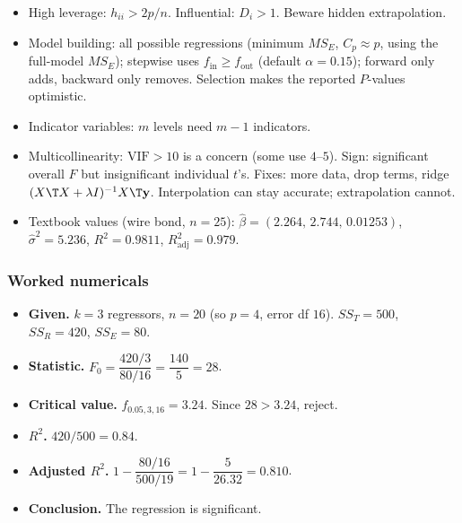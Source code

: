 \begin{notebox}
\begin{itemize}
  \item High leverage: $h_{ii}>2p/n$. Influential: $D_i>1$. Beware hidden extrapolation.
  \item Model building: all possible regressions (minimum $MS_E$, $C_p\approx p$, using the full-model $MS_E$); stepwise uses $f_{\mathrm{in}}\ge f_{\mathrm{out}}$ (default $\alpha=0.15$); forward only adds, backward only removes. Selection makes the reported $P$-values optimistic.
  \item Indicator variables: $m$ levels need $m-1$ indicators.
  \item Multicollinearity: $\mathrm{VIF}>10$ is a concern (some use $4$--$5$). Sign: significant overall $F$ but insignificant individual $t$'s. Fixes: more data, drop terms, ridge $(X\T X+\lambda I)^{-1}X\T\mathbf{y}$. Interpolation can stay accurate; extrapolation cannot.
  \item Textbook values (wire bond, $n=25$): $\hat\beta=(2.264,\,2.744,\,0.01253)$, $\hat\sigma^2=5.236$, $R^2=0.9811$, $R^2_{\mathrm{adj}}=0.979$.
\end{itemize}
\end{notebox}

\subsubsection*{Worked numericals}

\begin{example}
\begin{itemize}
  \item \textbf{Given.} $k=3$ regressors, $n=20$ (so $p=4$, error df $16$). $SS_T=500$, $SS_R=420$, $SS_E=80$.
  \item \textbf{Statistic.} $F_0=\dfrac{420/3}{80/16}=\dfrac{140}{5}=28$.
  \item \textbf{Critical value.} $f_{0.05,3,16}=3.24$. Since $28>3.24$, reject.
  \item \textbf{$R^2$.} $420/500=0.84$.
  \item \textbf{Adjusted $R^2$.} $1-\dfrac{80/16}{500/19}=1-\dfrac{5}{26.32}=0.810$.
  \item \textbf{Conclusion.} The regression is significant.
\end{itemize}
\end{example}

